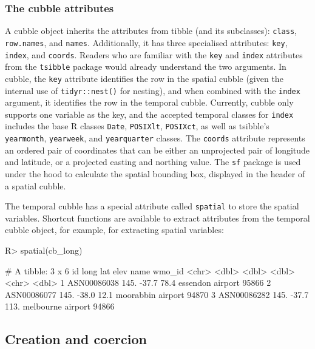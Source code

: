 \documentclass[
  shortnames]{jss}
\begin{document}
\hypertarget{the-cubble-attributes}{%
\subsubsection{The cubble attributes}\label{the-cubble-attributes}}

A cubble object inherits the attributes from tibble (and its subclasses): \texttt{class}, \texttt{row.names}, and \texttt{names}. Additionally, it has three specialised attributes: \texttt{key}, \texttt{index}, and \texttt{coords}. Readers who are familiar with the \texttt{key} and \texttt{index} attributes from the \texttt{tsibble} package would already understand the two arguments. In cubble, the \texttt{key} attribute identifies the row in the spatial cubble (given the internal use of \texttt{tidyr::nest()} for nesting), and when combined with the \texttt{index} argument, it identifies the row in the temporal cubble. Currently, cubble only supports one variable as the key, and the accepted temporal classes for \texttt{index} includes the base R classes \texttt{Date}, \texttt{POSIXlt}, \texttt{POSIXct}, as well as tsibble's \texttt{yearmonth}, \texttt{yearweek}, and \texttt{yearquarter} classes. The \texttt{coords} attribute represents an ordered pair of coordinates that can be either an unprojected pair of longitude and latitude, or a projected easting and northing value. The \texttt{sf} package is used under the hood to calculate the spatial bounding box, displayed in the header of a spatial cubble.

The temporal cubble has a special attribute called \texttt{spatial} to store the spatial variables. Shortcut functions are available to extract attributes from the temporal cubble object, for example,  for extracting spatial variables:

\begin{CodeChunk}
\begin{CodeInput}
R> spatial(cb_long)
\end{CodeInput}
\begin{CodeOutput}
# A tibble: 3 x 6
  id           long   lat  elev name              wmo_id
  <chr>       <dbl> <dbl> <dbl> <chr>              <dbl>
1 ASN00086038  145. -37.7  78.4 essendon airport   95866
2 ASN00086077  145. -38.0  12.1 moorabbin airport  94870
3 ASN00086282  145. -37.7 113.  melbourne airport  94866
\end{CodeOutput}
\end{CodeChunk}

\hypertarget{create}{%
\subsection{Creation and coercion}\label{create}}
\end{document}
